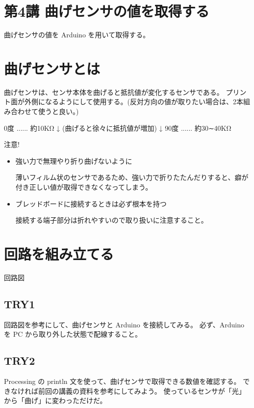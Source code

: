 \documentclass[11pt,a4paper]{jarticle}
\begin{document}
\section*{\LARGE{第4講 曲げセンサの値を取得する}}
曲げセンサの値を Arduino を用いて取得する。


\section{曲げセンサとは}
曲げセンサは、センサ本体を曲げると抵抗値が変化するセンサである。
プリント面が外側になるようにして使用する。(反対方向の値が取りたい場合は、2本組み合わせて使うと良い。)

0度 ...... 約10KΩ
↓
(曲げると徐々に抵抗値が増加)
↓
90度 ...... 約30∼40KΩ

\begin{itembox}{注意!}
 \begin{itemize}
  \item 強い力で無理やり折り曲げないように

	薄いフィルム状のセンサであるため、強い力で折りたたんだりすると、癖が付き正しい値が取得できなくなってしまう。

  \item ブレッドボードに接続するときは必ず根本を持つ
	
	接続する端子部分は折れやすいので取り扱いに注意すること。
 \end{itemize}
\end{itembox}

\section{回路を組み立てる}

回路図

\subsection*{TRY1}
回路図を参考にして、曲げセンサと Arduino を接続してみる。
必ず、Arduino を PC から取り外した状態で配線すること。

\subsection*{TRY2}
Processing の println 文を使って、曲げセンサで取得できる数値を確認する。
できなければ前回の講義の資料を参考にしてみよう。
使っているセンサが「光」から「曲げ」に変わっただけだ。
\end{document}
